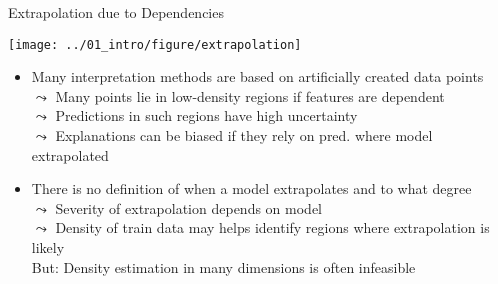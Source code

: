 \documentclass[11pt,compress,t,notes=noshow, aspectratio=169, xcolor=table]{beamer}
\begin{document}
\begin{frame}{Extrapolation due to Dependencies}
\centerline{\texttt{[image: ../01\_intro/figure/extrapolation]}}

\begin{itemize}
\item Many interpretation methods are based on
artificially created data points \\
$\leadsto$ Many points lie in low-density regions if features are dependent\\
$\leadsto$ Predictions in such regions have high uncertainty\\ %
$\leadsto$ Explanations can be biased if they rely on pred. where model extrapolated\\
\pause
\item There is no definition of when a model extrapolates and to what degree \\
$\leadsto$ Severity of extrapolation depends on model %
\\
$\leadsto$ Density of train data may helps identify regions where extrapolation is likely \\
\phantom{$\leadsto$} But: Density estimation in many dimensions is often infeasible
\end{itemize}

\end{frame}
\end{document}
